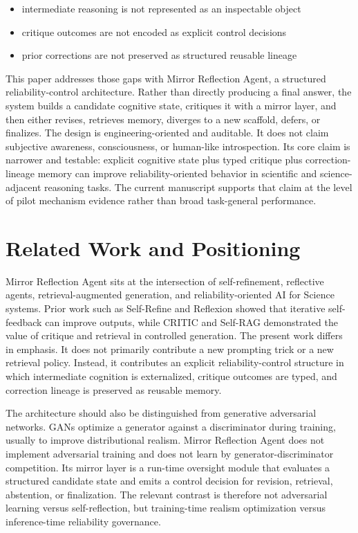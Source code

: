 \documentclass[12pt]{article}
\begin{document}
\begin{itemize}[leftmargin=1.2em]
\item intermediate reasoning is not represented as an inspectable object
\item critique outcomes are not encoded as explicit control decisions
\item prior corrections are not preserved as structured reusable lineage
\end{itemize}

This paper addresses those gaps with Mirror Reflection Agent, a structured reliability-control architecture. Rather than directly producing a final answer, the system builds a candidate cognitive state, critiques it with a mirror layer, and then either revises, retrieves memory, diverges to a new scaffold, defers, or finalizes. The design is engineering-oriented and auditable. It does not claim subjective awareness, consciousness, or human-like introspection. Its core claim is narrower and testable: explicit cognitive state plus typed critique plus correction-lineage memory can improve reliability-oriented behavior in scientific and science-adjacent reasoning tasks. The current manuscript supports that claim at the level of pilot mechanism evidence rather than broad task-general performance.

\section{Related Work and Positioning}

Mirror Reflection Agent sits at the intersection of self-refinement, reflective agents, retrieval-augmented generation, and reliability-oriented AI for Science systems. Prior work such as Self-Refine and Reflexion showed that iterative self-feedback can improve outputs, while CRITIC and Self-RAG demonstrated the value of critique and retrieval in controlled generation. The present work differs in emphasis. It does not primarily contribute a new prompting trick or a new retrieval policy. Instead, it contributes an explicit reliability-control structure in which intermediate cognition is externalized, critique outcomes are typed, and correction lineage is preserved as reusable memory.

The architecture should also be distinguished from generative adversarial networks. GANs optimize a generator against a discriminator during training, usually to improve distributional realism. Mirror Reflection Agent does not implement adversarial training and does not learn by generator-discriminator competition. Its mirror layer is a run-time oversight module that evaluates a structured candidate state and emits a control decision for revision, retrieval, abstention, or finalization. The relevant contrast is therefore not adversarial learning versus self-reflection, but training-time realism optimization versus inference-time reliability governance.
\end{document}
